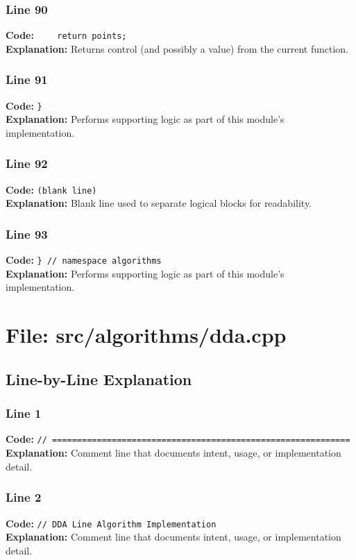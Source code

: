\documentclass[11pt,a4paper]{article}
\begin{document}
\subsubsection*{Line 90}
\textbf{Code:} \verb|    return points;|\\
\textbf{Explanation:} Returns control (and possibly a value) from the current function.

\subsubsection*{Line 91}
\textbf{Code:} \verb|}|\\
\textbf{Explanation:} Performs supporting logic as part of this module's implementation.

\subsubsection*{Line 92}
\textbf{Code:} \texttt{(blank line)}\\
\textbf{Explanation:} Blank line used to separate logical blocks for readability.

\subsubsection*{Line 93}
\textbf{Code:} \verb|} // namespace algorithms|\\
\textbf{Explanation:} Performs supporting logic as part of this module's implementation.

\newpage
\section{File: src/algorithms/dda.cpp}
\subsection{Line-by-Line Explanation}
\subsubsection*{Line 1}
\textbf{Code:} \verb|// ============================================================|\\
\textbf{Explanation:} Comment line that documents intent, usage, or implementation detail.

\subsubsection*{Line 2}
\textbf{Code:} \verb|// DDA Line Algorithm Implementation|\\
\textbf{Explanation:} Comment line that documents intent, usage, or implementation detail.
\end{document}
